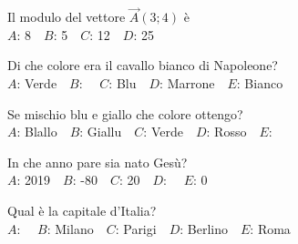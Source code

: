 \mcquestionfooter



\def\mcquestionnumber{6}


\mcquestionheader Il modulo del vettore $\vec{A}(3;4)$ è\\
{$A$}: 8\ \ {$B$}: 5\ \ {$C$}: 12\ \ {$D$}: 25\ \ 

\mcquestionfooter



\def\mcquestionnumber{7}


\mcquestionheader Di che colore era il cavallo bianco di Napoleone?\\
{$A$}: Verde\ \ {$B$}: \ \ {$C$}: Blu\ \ {$D$}: Marrone\ \ {$E$}: Bianco\ \ 

\mcquestionfooter



\def\mcquestionnumber{8}


\mcquestionheader Se mischio blu e giallo che colore ottengo?\\
{$A$}: Blallo\ \ {$B$}: Giallu\ \ {$C$}: Verde\ \ {$D$}: Rosso\ \ {$E$}: \ \ 

\mcquestionfooter



\def\mcquestionnumber{9}


\mcquestionheader In che anno pare sia nato Gesù?\\
{$A$}: 2019\ \ {$B$}: -80\ \ {$C$}: 20\ \ {$D$}: \ \ {$E$}: 0\ \ 

\mcquestionfooter



\def\mcquestionnumber{10}


\mcquestionheader Qual è la capitale d’Italia?\\
{$A$}: \ \ {$B$}: Milano\ \ {$C$}: Parigi\ \ {$D$}: Berlino\ \ {$E$}: Roma\ \ 

\mcquestionfooter



\def\mcquestionnumber{11}


